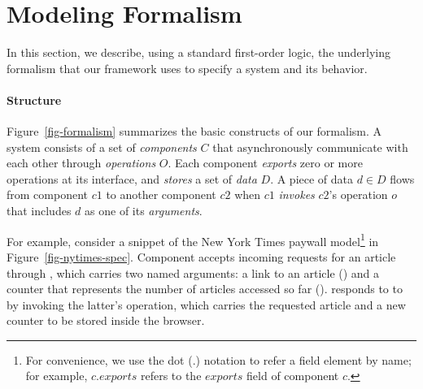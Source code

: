 \section{Modeling Formalism}
\label{sec-formalism}

In this section, we describe, using a standard first-order logic, the
underlying formalism that our framework uses to specify a system and
its behavior. 

\paragraph{\textbf{Structure}} Figure~\ref{fig-formalism} summarizes
the basic constructs of our formalism. A system consists of a set of
\textit{components} $C$ that asynchronously communicate with each
other through \textit{operations} $O$. Each component \textit{exports} zero or
more operations at its interface, and \textit{stores} a set of
\textit{data} $D$. A piece of data $d \in D$ flows from component $c1$
to another component $c2$ when $c1$ \textit{invokes} $c2$'s operation
$o$ that includes $d$ as one of its \textit{arguments}. 

For example, consider a snippet of the New York Times paywall
model\footnote{For convenience, we use the dot (.)  notation to refer
  a field element by name; for example, $c.exports$ refers to the
  $exports$ field of component $c$.} in
Figure~\ref{fig-nytimes-spec}. Component  accepts
incoming requests for an article through , which
carries two named arguments: a link to an article ()
and a counter that represents the number of articles accessed so far
().  responds to to
 by invoking the latter's 
operation, which carries the requested article and a new counter to be
stored inside the browser. 


\def\fsep{\;}
\def\bigsep{\quad\quad\quad\quad\;\;\:}

